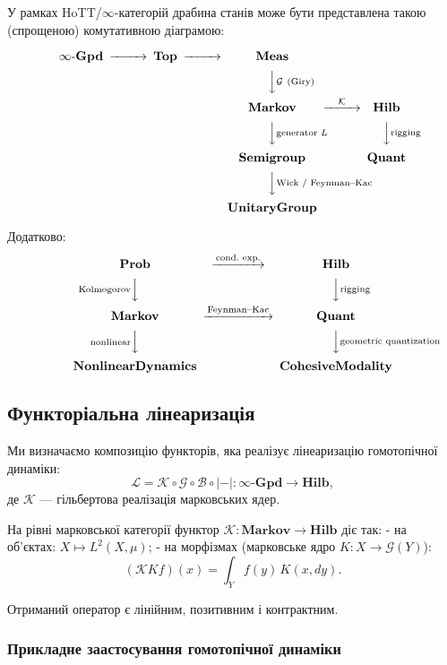 \documentclass[a4paper,12pt]{article}
\begin{document}
У рамках HoTT/$\infty$-категорій драбина станів може бути представлена такою (спрощеною) комутативною діаграмою:

\[
\begin{CD}
\infty\text{-}\mathbf{Gpd} @>>> \mathbf{Top} @>>> \mathbf{Meas} \\
@. @. @VV{\mathcal{G}\ (\text{Giry})}V \\
@. @. \mathbf{Markov} @>{\mathcal{K}}>> \mathbf{Hilb} \\
@. @. @VV{\text{generator }L}V @VV{\text{rigging}}V \\
@. @. \mathbf{Semigroup} @. \mathbf{Quant} \\
@. @. @VV{\text{Wick / Feynman--Kac}}V \\
@. @. \mathbf{UnitaryGroup}
\end{CD}
\]

Додатково:
\[
\begin{CD}
\mathbf{Prob} @>{\text{cond.\ exp.}}>> \mathbf{Hilb} \\
@V{\text{Kolmogorov}}VV @VV{\text{rigging}}V \\
\mathbf{Markov} @>{\text{Feynman--Kac}}>> \mathbf{Quant} \\
@V{\text{nonlinear}}VV @VV{\text{geometric quantization}}V \\
\mathbf{NonlinearDynamics} @. \mathbf{CohesiveModality}
\end{CD}
\]

\newpage
\subsection{Функторіальна лінеаризація}

Ми визначаємо композицію функторів, яка реалізує лінеаризацію гомотопічної динаміки:
\[
\mathcal{L} = \mathcal{K} \circ \mathcal{G} \circ \mathcal{B} \circ |{-}| \colon \infty\text{-}\mathbf{Gpd} \to \mathbf{Hilb},
\]
де $\mathcal{K}$ — гільбертова реалізація марковських ядер.

На рівні марковської категорії функтор $\mathcal{K} : \mathbf{Markov} \to \mathbf{Hilb}$ діє так:
- на об’єктах: $X \mapsto L^2(X, \mu)$;
- на морфізмах (марковське ядро $K : X \to \mathcal{G}(Y)$):
\[
(\mathcal{K}K f)(x) = \int_Y f(y) \, K(x, dy).
\]

Отриманий оператор є лінійним, позитивним і контрактним.

\subsubsection{Прикладне заастосування гомотопічної динаміки}
\end{document}

